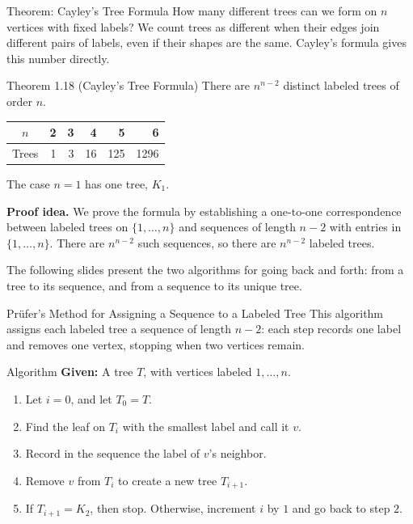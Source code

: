\documentclass[aspectratio=169,11pt]{beamer}
\begin{document}
\begin{frame}{Theorem: Cayley's Tree Formula}
\large
How many different trees can we form on $n$ vertices with fixed labels? We count trees as different when their edges join different pairs of labels, even if their shapes are the same. Cayley's formula gives this number directly.
\par\medskip
\begin{block}{Theorem 1.18 (Cayley's Tree Formula)}
There are $n^{n-2}$ distinct labeled trees of order $n$.
\end{block}
\begin{center}\begin{tabular}{c|rrrrr}$n$&2&3&4&5&6\\\hline Trees&1&3&16&125&1296\end{tabular}\end{center}\par\medskip The case $n=1$ has one tree, $K_1$.\par\medskip\normalsize
\textbf{Proof idea.} We prove the formula by establishing a one-to-one correspondence between labeled trees on $\{1,\ldots,n\}$ and sequences of length $n-2$ with entries in $\{1,\ldots,n\}$. There are $n^{n-2}$ such sequences, so there are $n^{n-2}$ labeled trees.
\par\smallskip
The following slides present the two algorithms for going back and forth: from a tree to its sequence, and from a sequence to its unique tree.
\end{frame}

\begin{frame}{Pr\"ufer's Method for Assigning a Sequence to a Labeled Tree}
\normalsize
This algorithm assigns each labeled tree a sequence of length $n-2$: each step records one label and removes one vertex, stopping when two vertices remain.
\par\medskip
\begin{block}{Algorithm}
\textbf{Given:} A tree $T$, with vertices labeled $1,\ldots,n$.
\par\medskip
\begin{enumerate}
\setlength{\itemsep}{0.22cm}
\item Let $i=0$, and let $T_0=T$.
\item Find the leaf on $T_i$ with the smallest label and call it $v$.
\item Record in the sequence the label of $v$'s neighbor.
\item Remove $v$ from $T_i$ to create a new tree $T_{i+1}$.
\item If $T_{i+1}=K_2$, then stop. Otherwise, increment $i$ by $1$ and go back to step $2$.
\end{enumerate}
\end{block}
\end{frame}
\end{document}
